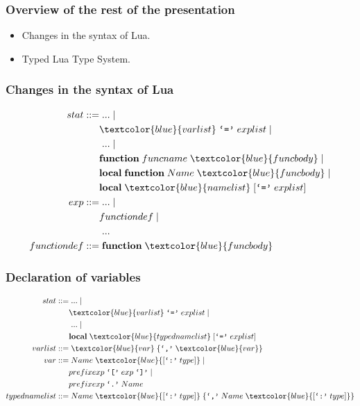 \documentclass{beamer}
\begin{document}
\begin{frame}
\frametitle{Overview of the rest of the presentation}
\begin{itemize}
\item Changes in the syntax of Lua.
\item Typed Lua Type System.
\end{itemize}
\end{frame}

\begin{frame}
\frametitle{Changes in the syntax of Lua}
\begin{align*}
stat ::= & \; ... \; |\\
& \textcolor{blue}{varlist} \; \texttt{`='} \; explist \; |\\
& \; ... \; |\\
& \textbf{function} \; funcname \; \textcolor{blue}{funcbody} \; |\\
& \textbf{local} \; \textbf{function} \; Name \; \textcolor{blue}{funcbody} \; |\\
& \textbf{local} \; \textcolor{blue}{namelist} \; [\texttt{`='} \; explist]\\
exp ::= & \; ... \; |\\
& functiondef \; |\\
& \; ...\\
functiondef ::= & \; \textbf{function} \; \textcolor{blue}{funcbody}
\end{align*}
\end{frame}

\begin{frame}
\frametitle{Declaration of variables}
\begin{align*}
stat ::= & \; ... \; |\\
& \textcolor{blue}{varlist} \; \texttt{`='} \; explist \; |\\
& \; ... \; |\\
& \textbf{local} \; \textcolor{blue}{typednamelist} \; [\texttt{`='} \; explist]\\
varlist ::= & \; \textcolor{blue}{var} \; \{\texttt{`,'} \; \textcolor{blue}{var}\}\\
var ::= & \; Name \; \textcolor{blue}{[\texttt{`:'} \; type]} \; |\\
& prefixexp \; \texttt{`['} \; exp \; \texttt{`]'} \; |\\
& prefixexp \; \texttt{`.'} \; Name\\
typednamelist ::= & \; Name \; \textcolor{blue}{[\texttt{`:'} \; type]} \;
\{\texttt{`,'} \; Name \; \textcolor{blue}{[\texttt{`:'} \; type]}\}
\end{align*}
\end{frame}
\end{document}
